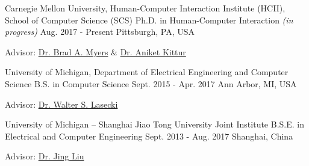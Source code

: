 

\begin{cventries}

  \cventry
    {Carnegie Mellon University, Human-Computer Interaction Institute (HCII), School of Computer Science (SCS)} %
    {Ph.D. in Human-Computer Interaction \bodyfontlight\mdseries\textit{(in progress)}} %
    {Aug. 2017 - Present} %
    {Pittsburgh, PA, USA} %
    {
      \begin{cvitems} %
        \item {Advisor: \href{http://www.cs.cmu.edu/~bam/}{Dr. Brad A. Myers} \& \href{http://kittur.org/}{Dr. Aniket Kittur}}
      \end{cvitems}
    }
  
  \cventry
    {University of Michigan, Department of Electrical Engineering and Computer Science} %
    {B.S. in Computer Science} %
    {Sept. 2015 - Apr. 2017} %
    {Ann Arbor, MI, USA} %
    {
      \begin{cvitems} %
        \item {Advisor: \href{http://wslasecki.com/}{Dr. Walter S. Lasecki}}
      \end{cvitems}
    }
  
  \cventry
    {University of Michigan – Shanghai Jiao Tong University Joint Institute} %
    {B.S.E. in Electrical and Computer Engineering} %
    {Sept. 2013 - Aug. 2017} %
    {Shanghai, China} %
    {
      \begin{cvitems} %
        \item {Advisor: \href{http://umji.sjtu.edu.cn/faculty/jing-liu/}{Dr. Jing Liu}}
      \end{cvitems}
    }

\end{cventries}
